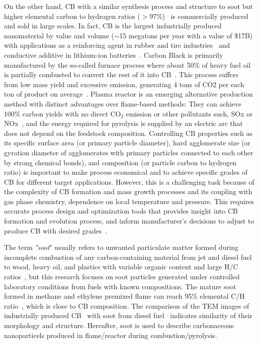 On the other hand, CB with a similar synthesis process and structure to soot but higher elemental carbon to hydrogen ratios ($>$97\%)~\citep{watson2001carbon} is commercially produced and sold in large scales. In fact, CB is the largest industrially produced nanomaterial by value and volume ($\sim$15 megatons per year with a value of \$17B) with applications as a reinforcing agent in rubber and tire industries~\citep{international2016carbon} and conductive additive in lithium-ion batteries~\citep{Palomares2010}. Carbon Black is primarily manufactured by the so-called furnace process where about 50\% of heavy fuel oil is partially combusted to convert the rest of it into CB~\citep{pratsinis2011history}. This process suffers from low mass yield and excessive emission, generating 4 tons of CO2 per each ton of product on average~\citep{bansal1993carbon}. Plasma reactor is an emerging alternative production method with distinct advantages over flame-based methods: They can achieve 100\% carbon yields with no direct $\mathrm{CO_2}$ emission or other pollutants such, SOx or NOx~\citep{cho2004conversion}, and the energy required for pyrolysis is supplied by an electric arc that does not depend on the feedstock composition. Controlling CB properties such as its specific surface area (or primary particle diameter), hard agglomerate size (or gyration diameter of agglomerates with primary particles connected to each other by strong chemical bonds), and composition (or particle carbon to hydrogen ratio) is important to make process economical and to achieve specific grades of CB for different target applications. However, this is a challenging task because of the complexity of CB formation and mass growth processes and its coupling with gas phase chemistry, dependence on local temperature and pressure. This requires accurate process design and optimization tools that provides insight into CB formation and evolution process, and inform manufacturer's decisions to adjust to produce CB with desired grades~\citep{park2005influence}.
 
The term \textit{"soot}" usually refers to unwanted particulate matter formed during incomplete combustion of any carbon-containing material from jet and diesel fuel to wood, heavy oil, and plastics with variable organic content and large H/C ratios~\citep{watson2001carbon}, but this research focuses on soot particles generated under controlled laboratory conditions from fuels with known compositions. The mature soot formed in methane and ethylene premixed flame can reach 95\% elemental C/H ratio~\cite{russo2015dehydrogenation}, which is close to CB composition. The comparison of the TEM images of industrially produced CB~\citep{singh2018nanostructure} with soot from diesel fuel~\citep{vander2007hrtem, lapuerta2017morphological} indicates similarity of their morphology and structure. Hereafter, soot is used to describe carbonaceous nanoparticels produced in flame/reactor during combustion/pyrolysis.

